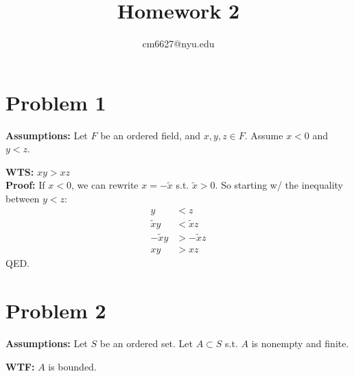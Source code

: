 \documentclass[12pt,fleqn]{article}
\title{Homework 2}
\author{cm6627@nyu.edu}
\date{}
\numberwithin{equation}{section} %
\begin{document}
\maketitle

\section*{Problem 1}
\textbf{Assumptions:} Let $F$ be an ordered field, and $x,y,z \in F$. Assume $x < 0$ and $y < z$.

\textbf{WTS:}
$xy > xz$
\\

\textbf{Proof:} If $x < 0$, we can rewrite $x = - \tilde x$ s.t. $\tilde x > 0$. So starting w/ the inequality between $y < z$:
\begin{align}
	y & < z\\
	\tilde x y & < \tilde x 	z\\
	- \tilde x y & > - \tilde x z\\
	x y & > x z
\end{align}
QED.

\section*{Problem 2}
\textbf{Assumptions:} Let $S$ be an ordered set. Let $A \subset S$ s.t. $A$ is nonempty and finite.

\textbf{WTF:} $A$ is bounded.
\end{document}

